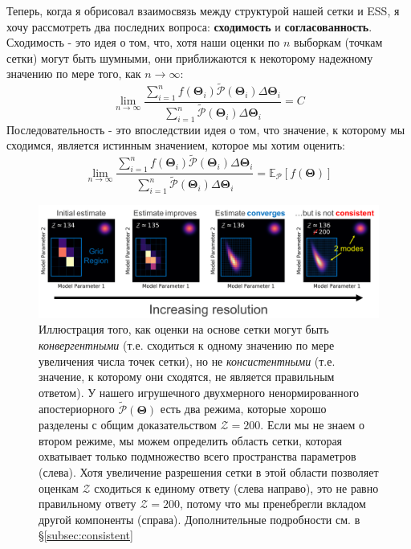 \documentclass[12pt, titlepage]{article}
\newcommand{\meanwrt}[2]{\ensuremath{\mathbb{E}_{{#2}}\left[{#1}\right]}}
\newcommand{\params}{\ensuremath{\boldsymbol\Theta}}
\newcommand{\posterior}{\ensuremath{\mathcal{P}}}
\newcommand{\evidence}{\ensuremath{\mathcal{Z}}}
\begin{document}
Теперь, когда я обрисовал взаимосвязь между структурой нашей сетки и ESS, я хочу рассмотреть два последних вопроса: \textbf{сходимость} и \textbf{согласованность}. Сходимость - это идея о том, что, хотя наши оценки по $n$ выборкам (точкам сетки) могут быть шумными, они приближаются к некоторому надежному значению по мере того, как $n \rightarrow \infty$:
\begin{equation}
    \lim_{n \rightarrow \infty} \frac{\sum_{i=1}^{n} f(\params_i) 
    \tilde{\posterior}(\params_i) \Delta \params_i}
    {\sum_{i=1}^{n}\tilde{\posterior}(\params_i) \Delta \params_i}
    = C
\end{equation}
Последовательность - это впоследствии идея о том, что значение, к которому мы сходимся, является истинным значением, которое мы хотим оценить:
\begin{equation}
    \lim_{n \rightarrow \infty} \frac{\sum_{i=1}^{n} f(\params_i) 
    \tilde{\posterior}(\params_i) \Delta \params_i}
    {\sum_{i=1}^{n}\tilde{\posterior}(\params_i) \Delta \params_i}
    = \meanwrt{f(\params)}{\posterior}
\end{equation}

\begin{figure}
\begin{center}
\includegraphics[width=\textwidth]{figures/fig5.png}
\end{center}
\caption{Иллюстрация того, как оценки на основе сетки могут быть \textit{конвергентными} (т.е. сходиться к одному значению по мере увеличения числа точек сетки), но не \textit{консистентными} (т.е. значение, к которому они сходятся, не является правильным ответом). У нашего игрушечного двухмерного ненормированного апостериорного $\tilde{\posterior}(\params)$ есть два режима, которые хорошо разделены с общим доказательством $\evidence = 200$. Если мы не знаем о втором режиме, мы можем определить область сетки, которая охватывает только подмножество всего пространства параметров (слева). Хотя увеличение разрешения сетки в этой области позволяет оценкам $\evidence$ сходиться к единому ответу (слева направо), это не равно правильному ответу $\evidence = 200$, потому что мы пренебрегли вкладом другой компоненты (справа). Дополнительные подробности см. в \S\ref{subsec:consistent}
}\label{fig:conv}
\end{figure}
\end{document}
